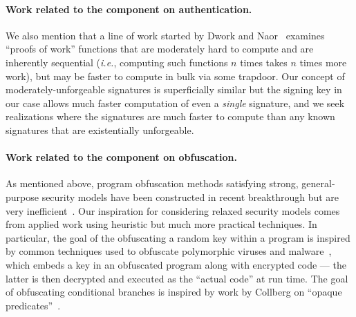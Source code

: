 \paragraph*{\large{Work related to the component on authentication.}}


We also mention that  a line of work started by Dwork and Naor~\cite{} examines ``proofs of work'' functions that are moderately hard to compute and are inherently sequential (\emph{i.e.}, computing such functions $n$ times takes $n$ times more work), but may be faster to compute in bulk via some trapdoor.  Our concept of moderately-unforgeable signatures is superficially similar but the signing key in our case allows much faster computation of even a \emph{single} signature, and we seek realizations where the signatures are much faster to compute than any known signatures that are existentially unforgeable.  

\paragraph*{\large{Work related to the component on obfuscation.}}
As mentioned above, program obfuscation methods satisfying strong, general-purpose security models have been constructed in recent breakthrough but are very inefficient~\cite{}.   Our inspiration for considering relaxed security models comes from applied work using heuristic but much more practical techniques.  In particular, the goal of the obfuscating a random key within a program is inspired by common techniques used to obfuscate polymorphic viruses and malware~\cite{}, which  embeds a key in an obfuscated program along with encrypted code --- the latter is then decrypted and executed as the ``actual code'' at run time.
The goal of obfuscating conditional branches is inspired by  work by Collberg on ``opaque predicates''~\cite{}.
\fi

